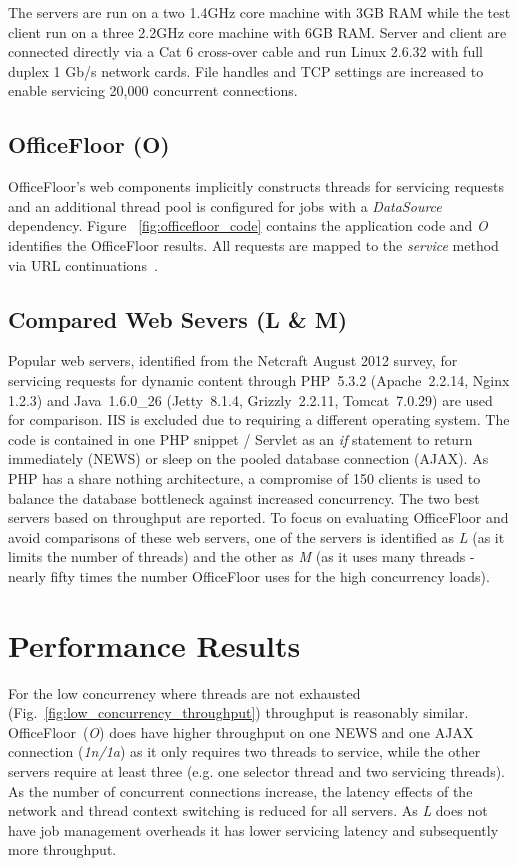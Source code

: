 \documentclass[conference]{ieee/IEEEtran}
\begin{document}
The servers are run on a two 1.4GHz core machine with 3GB RAM while the test
client run on a three 2.2GHz core machine with 6GB RAM.  Server and client are
connected directly via a Cat 6 cross-over cable and run Linux 2.6.32 with full
duplex 1 Gb/s network cards.  File handles and TCP settings are increased to
enable servicing 20,000 concurrent connections.

\subsection{OfficeFloor (O)}
OfficeFloor's web components implicitly constructs threads for servicing
requests and an additional thread pool is configured for jobs with a
\textit{DataSource} dependency.  Figure ~\ref{fig:officefloor_code} contains the
application code and \textit{O} identifies the OfficeFloor results.  All
requests are mapped to the \textit{service} method via URL
continuations~\cite{url-continuation}.


\subsection{Compared Web Severs (L \& M)}
Popular web servers, identified from the Netcraft August 2012 survey, for
servicing requests for dynamic content through PHP~5.3.2 (Apache~2.2.14, Nginx
1.2.3) and Java~1.6.0\_26 (Jetty~8.1.4, Grizzly~2.2.11, Tomcat~7.0.29) are used
for comparison.  IIS is excluded due to requiring a different operating system.
The code is contained in one PHP snippet / Servlet as an \textit{if} statement
to return immediately (NEWS) or sleep on the pooled database connection (AJAX).
As PHP has a share nothing architecture, a compromise of 150 clients is used to
balance the database bottleneck against increased concurrency.  The two best
servers based on throughput are reported.  To focus on evaluating OfficeFloor
and avoid comparisons of these web servers, one of the servers is identified as
\textit{L} (as it limits the number of threads) and the other as \textit{M} (as
it uses many threads - nearly fifty times the number OfficeFloor uses for
the high concurrency loads).



\section{Performance Results}
For the low concurrency where threads are not exhausted
(Fig.~\ref{fig:low_concurrency_throughput}) throughput is reasonably similar.
OfficeFloor~(\textit{O}) does have higher throughput on one NEWS and one AJAX
connection (\textit{1n/1a}) as it only requires two threads to service, while
the other servers require at least three (e.g. one selector thread and two
servicing threads).  As the number of concurrent connections increase, the
latency effects of the network and thread context switching is reduced for all
servers.  As \textit{L} does not have job management overheads it has lower
servicing latency and subsequently more throughput.
\end{document}
